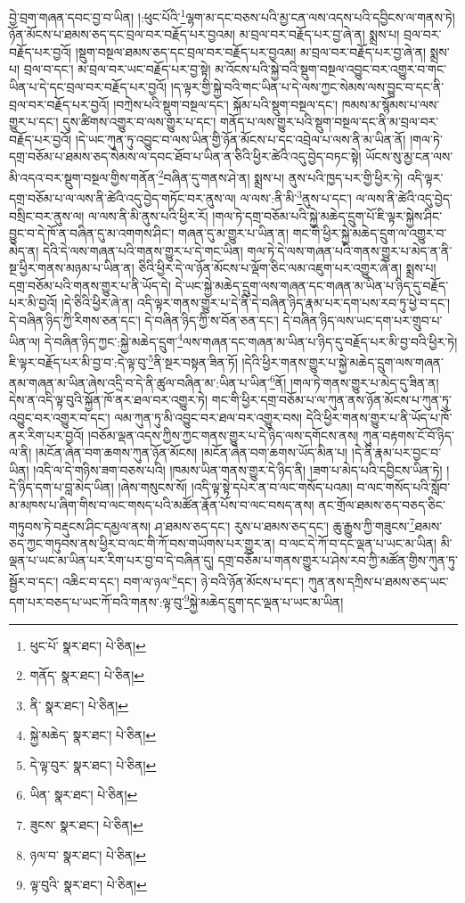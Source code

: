 བྱེ་བྲག་གཞན་དབང་བྱ་བ་ཡིན། །:ཕུང་པོའི་\footnote{ཕུང་པོ་  སྣར་ཐང་།  པེ་ཅིན། }ལྷག་མ་དང་བཅས་པའི་མྱ་ངན་ལས་འདས་པའི་དབྱིངས་ལ་གནས་ཏེ། ཉོན་མོངས་པ་ཐམས་ཅད་དང་བྲལ་བར་བརྗོད་པར་བྱའམ། མ་བྲལ་བར་བརྗོད་པར་བྱ་ཞེ་ན། སྨྲས་པ། བྲལ་བར་བརྗོད་པར་བྱའོ། །སྡུག་བསྔལ་ཐམས་ཅད་དང་བྲལ་བར་བརྗོད་པར་བྱའམ། མ་བྲལ་བར་བརྗོད་པར་བྱ་ཞེ་ན། སྨྲས་པ། བྲལ་བ་དང་། མ་བྲལ་བར་ཡང་བརྗོད་པར་བྱ་སྟེ། མ་འོངས་པའི་སྐྱེ་བའི་སྡུག་བསྔལ་འབྱུང་བར་འགྱུར་བ་གང་ཡིན་པ་དེ་དང་བྲལ་བར་བརྗོད་པར་བྱའོ། །ད་ལྟར་གྱི་སྐྱེ་བའི་གང་ཡིན་པ་དེ་ལས་ཀྱང་སེམས་ལས་བྱུང་བ་དང་ནི་བྲལ་བར་བརྗོད་པར་བྱའོ། །བཀྲེས་པའི་སྡུག་བསྔལ་དང་། སྐོམ་པའི་སྡུག་བསྔལ་དང་། ཁམས་མ་སྙོམས་པ་ལས་གྱུར་པ་དང་། དུས་ཚིགས་འགྱུར་བ་ལས་གྱུར་པ་དང་། གནོད་པ་ལས་གྱུར་པའི་སྡུག་བསྔལ་དང་ནི་མ་བྲལ་བར་བརྗོད་པར་བྱའོ། །དེ་ཡང་ཀུན་ཏུ་འབྱུང་བ་ལས་ཡིན་གྱི་ཉོན་མོངས་པ་དང་འབྲེལ་པ་ལས་ནི་མ་ཡིན་ནོ། །གལ་ཏེ་དགྲ་བཅོམ་པ་ཐམས་ཅད་སེམས་ལ་དབང་ཐོབ་པ་ཡིན་ན་ཅིའི་ཕྱིར་ཚེའི་འདུ་བྱེད་བཏང་སྟེ། ཡོངས་སུ་མྱ་ངན་ལས་མི་འདའ་བར་སྡུག་བསྔལ་གྱིས་གནོན་\footnote{གནོད་  སྣར་ཐང་།  པེ་ཅིན། }བཞིན་དུ་གནས་ཤེ་ན། སྨྲས་པ། ནུས་པའི་ཁྱད་པར་གྱི་ཕྱིར་ཏེ། འདི་ལྟར་དགྲ་བཅོམ་པ་ལ་ལས་ནི་ཚེའི་འདུ་བྱེད་གཏོང་བར་ནུས་ལ། ལ་ལས་:ནི་མི་\footnote{ནི་  སྣར་ཐང་།  པེ་ཅིན། }ནུས་པ་དང་། ལ་ལས་ནི་ཚེའི་འདུ་བྱེད་བསྲིང་བར་ནུས་ལ། ལ་ལས་ནི་མི་ནུས་པའི་ཕྱིར་རོ། །གལ་ཏེ་དགྲ་བཅོམ་པའི་སྐྱེ་མཆེད་དྲུག་པོ་ཇི་ལྟར་སྐྱེས་ཤིང་བྱུང་བ་དེ་ཁོ་ན་བཞིན་དུ་མ་འགགས་ཤིང་། གཞན་དུ་མ་གྱུར་པ་ཡིན་ན། གང་གི་ཕྱིར་སྐྱེ་མཆེད་དྲུག་ལ་འགྱུར་བ་མེད་ན། དེའི་དེ་ལས་གཞན་པའི་གནས་གྱུར་པ་དེ་གང་ཡིན། གལ་ཏེ་དེ་ལས་གཞན་པའི་གནས་གྱུར་པ་མེད་ན་ནི་སྔ་ཕྱིར་གནས་མཉམ་པ་ཡིན་ན། ཅིའི་ཕྱིར་དེ་ལ་ཉོན་མོངས་པ་ལྡོག་ཅིང་ལམ་འཇུག་པར་འགྱུར་ཞེ་ན། སྨྲས་པ། དགྲ་བཅོམ་པའི་གནས་གྱུར་པ་ནི་ཡོད་དེ། དེ་ཡང་སྐྱེ་མཆེད་དྲུག་ལས་གཞན་དང་གཞན་མ་ཡིན་པ་ཉིད་དུ་བརྗོད་པར་མི་བྱའོ། །དེ་ཅིའི་ཕྱིར་ཞེ་ན། འདི་ལྟར་གནས་གྱུར་པ་དེ་ནི་དེ་བཞིན་ཉིད་རྣམ་པར་དག་པས་རབ་ཏུ་ཕྱེ་བ་དང་། དེ་བཞིན་ཉིད་ཀྱི་རིགས་ཅན་དང་། དེ་བཞིན་ཉིད་ཀྱི་ས་བོན་ཅན་དང་། དེ་བཞིན་ཉིད་ལས་ཡང་དག་པར་གྲུབ་པ་ཡིན་ལ། དེ་བཞིན་ཉིད་ཀྱང་:སྐྱེ་མཆེད་དྲུག་\footnote{སྐྱེ་མཆེད་  སྣར་ཐང་།  པེ་ཅིན། }ལས་གཞན་དང་གཞན་མ་ཡིན་པ་ཉིད་དུ་བརྗོད་པར་མི་བྱ་བའི་ཕྱིར་ཏེ། ཇི་ལྟར་བརྗོད་པར་མི་བྱ་བ་:དེ་ལྟ་བུ་\footnote{དེ་ལྟ་བུར་  སྣར་ཐང་།  པེ་ཅིན། }ནི་སྔར་བསྟན་ཟིན་ཏོ། །དེའི་ཕྱིར་གནས་གྱུར་པ་སྐྱེ་མཆེད་དྲུག་ལས་གཞན་ནམ་གཞན་མ་ཡིན་ཞེས་འདྲི་བ་དེ་ནི་ཚུལ་བཞིན་མ་:ཡིན་པ་ཡིན་\footnote{ཡིན་  སྣར་ཐང་།  པེ་ཅིན། }ནོ། །གལ་ཏེ་གནས་གྱུར་པ་མེད་དུ་ཟིན་ན། དེས་ན་འདི་ལྟ་བུའི་སྐྱོན་ཁོ་ནར་ཐལ་བར་འགྱུར་ཏེ། གང་གི་ཕྱིར་དགྲ་བཅོམ་པ་ལ་ཀུན་ནས་ཉོན་མོངས་པ་ཀུན་ཏུ་འབྱུང་བར་འགྱུར་བ་དང་། ལམ་ཀུན་ཏུ་མི་འབྱུང་བར་ཐལ་བར་འགྱུར་བས། དེའི་ཕྱིར་གནས་གྱུར་པ་ནི་ཡོད་པ་ཁོ་ནར་རིག་པར་བྱའོ། །བཅོམ་ལྡན་འདས་ཀྱིས་ཀྱང་གནས་གྱུར་པ་དེ་ཉིད་ལས་དགོངས་ནས། ཀུན་བརྟགས་ངོ་བོ་ཉིད་ལ་ནི། །མངོན་ཞེན་བག་ཆགས་ཀུན་ཉོན་མོངས། །མངོན་ཞེན་བག་ཆགས་ཡོད་མིན་པ། །དེ་ནི་རྣམ་པར་བྱང་བ་ཡིན། །འདི་ལ་དེ་གཉིས་ཟག་བཅས་པའི། །ཁམས་ཡིན་གནས་གྱུར་དེ་ཉིད་ནི། །ཟག་པ་མེད་པའི་དབྱིངས་ཡིན་ཏེ། །དེ་ཉིད་དག་པ་བླ་མེད་ཡིན། །ཞེས་གསུངས་སོ། །འདི་ལྟ་སྟེ་དཔེར་ན་བ་ལང་གསོད་པའམ། བ་ལང་གསོད་པའི་སློབ་མ་མཁས་པ་ཞིག་གིས་བ་ལང་གསད་པའི་མཚོན་རྣོན་པོས་བ་ལང་བསད་ནས། ནང་གྲོལ་ཐམས་ཅད་བཅད་ཅིང་གཏུབས་ཏེ་བརྡུངས་ཤིང་དམྱལ་ནས། ཤ་ཐམས་ཅད་དང་། རུས་པ་ཐམས་ཅད་དང་། ཆུ་རྒྱུས་ཀྱི་གཟུངས་\footnote{ཟུངས་  སྣར་ཐང་།  པེ་ཅིན། }ཐམས་ཅད་ཀྱང་གཏུབས་ནས་ཕྱིར་བ་ལང་གི་ཀོ་བས་གཡོགས་པར་གྱུར་ན། བ་ལང་དེ་ཀོ་བ་དང་ལྡན་པ་ཡང་མ་ཡིན། མི་ལྡན་པ་ཡང་མ་ཡིན་པར་རིག་པར་བྱ་བ་དེ་བཞིན་དུ། དགྲ་བཅོམ་པ་གནས་གྱུར་པ་ཤེས་རབ་ཀྱི་མཚོན་གྱིས་ཀུན་ཏུ་སྦྱོར་བ་དང་། འཆིང་བ་དང་། བག་ལ་ཉལ་\footnote{ཉལ་བ་  སྣར་ཐང་།  པེ་ཅིན། }དང་། ཉེ་བའི་ཉོན་མོངས་པ་དང་། ཀུན་ནས་དཀྲིས་པ་ཐམས་ཅད་ཡང་དག་པར་བཅད་པ་ཡང་ཀོ་བའི་གནས་:ལྟ་བུ་\footnote{ལྟ་བུའི་  སྣར་ཐང་།  པེ་ཅིན། }སྐྱེ་མཆེད་དྲུག་དང་ལྡན་པ་ཡང་མ་ཡིན། 